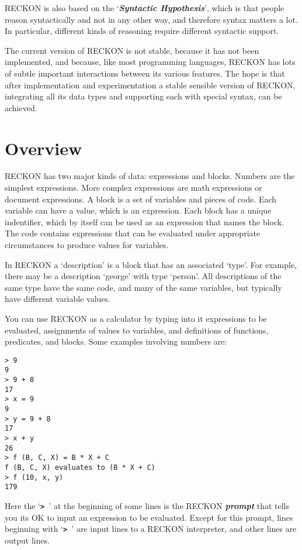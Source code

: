 \documentclass[12pt]{article}
\newcommand{\TT}[1]{{\tt \bfseries #1}}
\newcommand{\key}[1]{{\bf \em #1}\index{#1}}
\newenvironment{indpar}[1][0.3in]%
	{\begin{list}{}%
		     {\setlength{\itemsep}{0in}%
		      \setlength{\topsep}{0in}%
		      \setlength{\parsep}{1ex}%
		      \setlength{\labelwidth}{#1}%
		      \setlength{\leftmargin}{#1}%
		      \addtolength{\leftmargin}{\labelsep}}%
	 \item}%
	{\end{list}}
\begin{document}
RECKON is also based on the `\key{Syntactic Hypothesis}', which is that
people reason syntactically and not in any other way, and therefore
syntax matters a lot.  In particular, different kinds of reasoning
require different syntactic support.

The current version of RECKON is not stable, because it has not been
implemented, and because, like most programming languages, RECKON
has lots of subtle important interactions between its various features.  The
hope is that after implementation and experimentation a stable sensible
version of RECKON, integrating all its data types and supporting each
with special syntax, can be achieved.

\section{Overview}

RECKON has two major kinds of data: expressions and blocks.  Numbers are
the simplest expressions.  More complex expressions are math
expressions or document expressions.  A block is a set of variables
and pieces of code.  Each variable can have a value, which is an expression.
Each block has a unique indentifier, which by itself can be used as
an expression that names the block.
The code contains expressions that can be evaluated under appropriate
circumstances to produce values for variables.

In RECKON a `description' is a block that has an associated `type'.  For
example, there may be a description `george' with type `person'.  All
descriptions of the same type have the same code,
and many of the same variables,
but typically have different variable values.

You can use RECKON as a calculator by typing into it expressions to
be evaluated, assignments of values to variables, and definitions
of functions, predicates, and blocks.  Some examples involving numbers are:

\begin{indpar}\begin{verbatim}
> 9
9
> 9 + 8
17
> x = 9
9
> y = 9 + 8
17
> x + y
26
> f (B, C, X) = B * X + C
f (B, C, X) evaluates to (B * X + C)
> f (10, x, y)
179
\end{verbatim}\end{indpar}

Here the `\TT{>~}' at the beginning of some lines is the RECKON \key{prompt}
that tells you its OK to input an expression to be evaluated.
Except for this prompt, lines beginning with `\TT{> }' are input lines to
a RECKON interpreter, and other lines are output lines.
\end{document}

